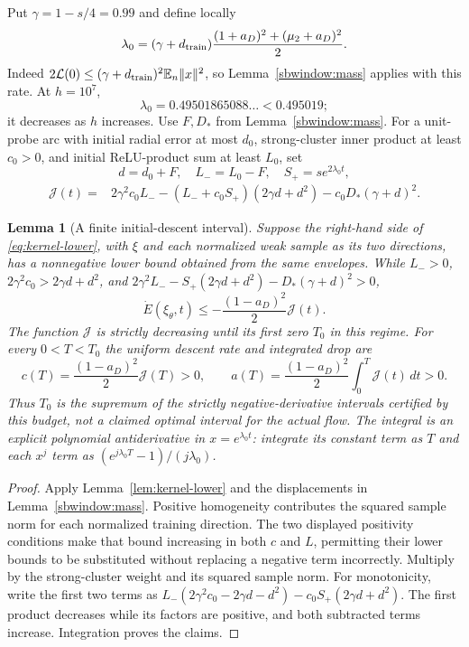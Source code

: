 \documentclass[10pt]{article}
\newtheorem{lemma}[theorem]{Lemma}
\theoremstyle{remark}\newtheorem{remark}[theorem]{Remark}
\begin{document}
Put $\gamma=1-s/4=0.99$ and define locally
\begin{equation}\label{eq:lambda-local}
 \lambda_0=(\gamma+d_{\rm train})
 \frac{(1+a_D)^2+(\mu_2+a_D)^2}{2}.
\end{equation}
Indeed $2\mathcal L(0)\le(\gamma+d_{\rm train})^2\mathbb E_n\|x\|^2$,
so Lemma~\ref{sbwindow:mass} applies with this rate. At $h=10^7$,
\[
 \lambda_0=0.49501865088\ldots<0.495019;
\]
it decreases as $h$ increases. Use $F,D_*$ from Lemma~\ref{sbwindow:mass}.
For a unit-probe arc with initial radial error at most $d_0$, strong-cluster
inner product at least $c_0>0$, and initial ReLU-product sum at least $L_0$,
set
\[
 d=d_0+F,\quad L_-=L_0-F,\quad S_+=se^{2\lambda_0t},
\]
\begin{equation}\label{eq:descent-budget}
 \begin{split}
 \mathcal J(t)={}&2\gamma^2c_0L_-
 -(L_-+c_0S_+)(2\gamma d+d^2)
 -c_0D_*(\gamma+d)^2.
 \end{split}
\end{equation}


\begin{lemma}[A finite initial-descent interval]
\label{sbsharp:descent}
Suppose the right-hand side of \eqref{eq:kernel-lower}, with
$\xi$ and each normalized weak sample as its two directions, has a
nonnegative lower bound obtained from the same envelopes.
While $L_->0$, $2\gamma^2c_0>2\gamma d+d^2$, and
$2\gamma^2L_--S_+(2\gamma d+d^2)-D_*(\gamma+d)^2>0$,
\[
 \dot E(\xi_\theta,t)\le-\frac{(1-a_D)^2}{2}\mathcal J(t).
\]
The function $\mathcal J$ is strictly decreasing until its first zero
$T_0$ in this regime. For every $0<T<T_0$ the uniform descent rate and
integrated drop are
\[
 c(T)=\frac{(1-a_D)^2}{2}\mathcal J(T)>0,\qquad
 a(T)=\frac{(1-a_D)^2}{2}\int_0^T\mathcal J(t)\,dt>0.
\]
Thus $T_0$ is the supremum of the strictly negative-derivative intervals
certified by \emph{this budget}, not a claimed optimal interval for the
actual flow. The integral is an explicit polynomial antiderivative in
$x=e^{\lambda_0t}$: integrate its constant term as $T$ and each $x^j$
term as $(e^{j\lambda_0T}-1)/(j\lambda_0)$.
\end{lemma}
\begin{proof}
Apply Lemma~\ref{lem:kernel-lower} and the displacements in
Lemma~\ref{sbwindow:mass}. Positive homogeneity contributes the squared
sample norm for each normalized training direction. The two displayed positivity conditions
make that bound increasing in both $c$ and $L$, permitting their lower
bounds to be substituted without replacing a negative term incorrectly.
Multiply by the strong-cluster weight and its squared sample norm.
For monotonicity, write the first two terms as
$L_-(2\gamma^2c_0-2\gamma d-d^2)-c_0S_+(2\gamma d+d^2)$.
The first product decreases while its factors are positive, and both
subtracted terms increase. Integration proves the claims.
\end{proof}
\end{document}
